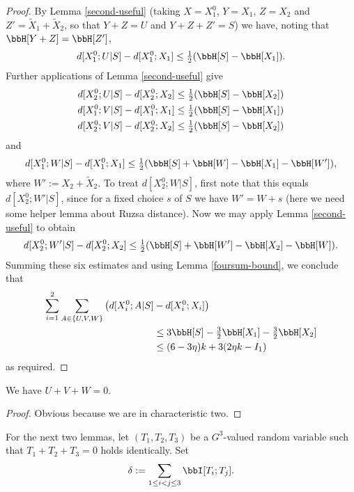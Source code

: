 \begin{proof}
  By Lemma \ref{second-useful} (taking $X = X_1^0$, $Y = X_1$, $Z = X_2$ and $Z' = \tilde X_1 + \tilde X_2$, so that $Y + Z = U$ and $Y + Z + Z' = S$) we have, noting that $\bbH[Y+ Z] = \bbH[Z']$,
  \[
    d[X^0_1;U|S] - d[X^0_1;X_1] \leq \tfrac{1}{2} (\bbH[S] -  \bbH[X_1]).
  \]
  Further applications of Lemma \ref{second-useful} give
  \begin{align*}
  d[X^0_2;U|S] - d[X^0_2; X_2] &\leq \tfrac{1}{2} (\bbH[S] -  \bbH[X_2]) \\
  d[X^0_1;V|S] - d[X^0_1;X_1] &\leq \tfrac{1}{2} (\bbH[S] -  \bbH[X_1])\\
  d[X^0_2;V|S] - d[X^0_2;X_2] &\leq \tfrac{1}{2} (\bbH[S] -  \bbH[X_2])
  \end{align*}
  and
  \[d[X^0_1;W|S] - d[X^0_1;X_1] \leq \tfrac{1}{2} (\bbH[S] + \bbH[W] - \bbH[X_1] - \bbH[W']),\] where $W' := X_2 + \tilde X_2$.
  To treat $d[X^0_2;W|S]$, first note that this equals $d[X^0_2;W'|S]$, since for a fixed choice $s$ of $S$ we have $W' = W + s$ (here we need some helper lemma about Ruzsa distance). Now we may apply Lemma \ref{second-useful} to obtain
  \[d[X^0_2;W'|S] - d[X^0_2;X_2] \leq \tfrac{1}{2} (\bbH[S] + \bbH[W'] - \bbH[X_2] - \bbH[W]).\]
  Summing these six estimates and using Lemma \ref{foursum-bound}, we conclude that
  \begin{align*}
    \sum_{i=1}^2 \sum_{A\in\{U,V,W\}} \big(d[X^0_i;A|S] & - d[X^0_i;X_i]\big) \\
      &\leq 3 \bbH[S] - \tfrac{3}{2} \bbH[X_1] - \tfrac{3}{2} \bbH[X_2]\\
      &\leq (6 - 3\eta) k + 3(2 \eta k - I_1)
  \end{align*}
  as required.
\end{proof}

\begin{lemma}\label{key-ident}
\leanok
We have $U+V+W=0$.
\end{lemma}

\begin{proof} \leanok Obvious because we are in characteristic two.
\end{proof}

For the next two lemmas, let $(T_1,T_2,T_3)$ be a $G^3$-valued random variable such that $T_1+T_2+T_3=0$ holds identically. Set
\begin{equation}\label{delta-t1t2t3-def}
  \delta := \sum_{1 \leq i < j \leq 3} \bbI[T_i;T_j].
\end{equation}

